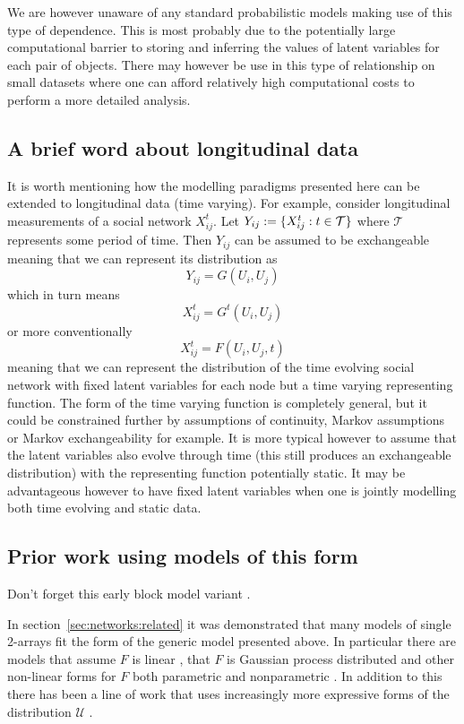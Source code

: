 We are however unaware of any standard probabilistic models making use of this type of dependence.
This is most probably due to the potentially large computational barrier to storing and inferring the values of latent variables for each pair of objects.
There may however be use in this type of relationship on small datasets where one can afford relatively high computational costs to perform a more detailed analysis.

\subsection{A brief word about longitudinal data}

It is worth mentioning how the modelling paradigms presented here can be extended to longitudinal data (\ie time varying).
For example, consider longitudinal measurements of a social network $X_{ij}^t$.
Let $Y_{ij} := \{X_{ij}^t : t \in \mathcal{T}\}$ where $\mathcal{T}$ represents some period of time.
Then $Y_{ij}$ can be assumed to be exchangeable meaning that we can represent its distribution as
\[
  Y_{ij} = G(U_i, U_j)
\]
which in turn means
\[
  X_{ij}^t = G^t(U_i, U_j)
\]
or more conventionally
\[
  X_{ij}^t = F(U_i, U_j, t)
\]
meaning that we can represent the distribution of the time evolving social network with fixed latent variables for each node but a time varying representing function.
The form of the time varying function is completely general, but it could be constrained further by assumptions of continuity, Markov assumptions or Markov exchangeability for example.
It is more typical however to assume that the latent variables also evolve through time (this still produces an exchangeable distribution) with the representing function potentially static.
It may be advantageous however to have fixed latent variables when one is jointly modelling both time evolving and static data.

\subsection{Prior work using models of this form}

Don't forget this early block model variant \cite{Hoffman_undated-ri}.

In section~\ref{sec:networks:related} it was demonstrated that many models of single 2-arrays fit the form of the generic model presented above.
In particular there are models that assume $F$ is linear \citep[e.g.][]{Hoff2007a, Meeds2007, Salakhutdinov2008, Yu2008, Miller2009}, that $F$ is Gaussian process distributed \citep[e.g.][]{Lawrence2009, Yan2011, Lloyd2012} and other non-linear forms for $F$ both parametric \citep[e.g.][]{Hoff2002} and nonparametric \citep[e.g.][]{Roy2009}.
In addition to this there has been a line of work that uses increasingly more expressive forms of the distribution $\mathcal{U}$ \citep[e.g.][]{Wang1987, Nowicki2001, Kemp2006, Xu2006, Meeds2007, Miller2009, Palla2012}.

